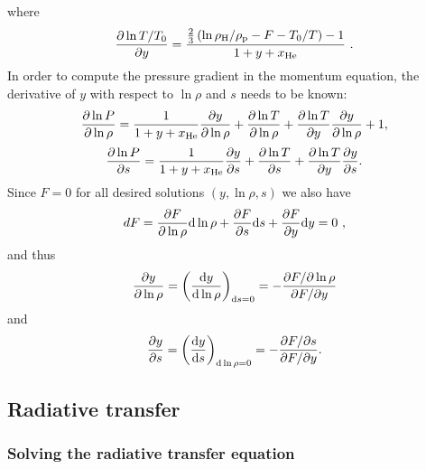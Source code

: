 \documentclass[\mydriver,12pt,twoside,notitlepage,a4paper]{article}
\begin{document}
where
\begin{equation}
\frac{\partial\ln T/T_0}{\partial y}
=\frac{\frac{2}{3}\left(\ln\rho_{\rm H}/\rho_{\rm p}-F-T_0/T\right)-1}
      {1+y+x_{\rm He}}\ .
\end{equation}
In order to compute the pressure gradient in the momentum equation,
the derivative of $y$ with respect
to $\ln\rho$ and $s$ needs to be known:
\begin{equation}
\frac{\partial\ln P}{\partial\ln\rho}
=\frac{1}{1+y+x_{\rm He}}\frac{\partial y}{\partial\ln\rho}
+\frac{\partial\ln T}{\partial\ln\rho}
+\frac{\partial\ln T}{\partial y}\frac{\partial y}{\partial\ln\rho}+1,
\end{equation}
\begin{equation}
\frac{\partial\ln P}{\partial s}
=\frac{1}{1+y+x_{\rm He}}\frac{\partial y}{\partial s}
+\frac{\partial\ln T}{\partial s}
+\frac{\partial\ln T}{\partial y}\frac{\partial y}{\partial s}.
\end{equation}
Since $F=0$ for all desired solutions $(y,\ln\rho,s)$ we also have
\begin{equation}
dF=\frac{\partial F}{\partial\ln\rho}{\rm d}\ln\rho
   +\frac{\partial F}{\partial s}{\rm d} s
   +\frac{\partial F}{\partial y}{\rm d} y=0\ ,
\end{equation}
and thus
\begin{equation}
\frac{\partial y}{\partial\ln\rho}
=\left(\frac{{\rm d} y}{{\rm d}\ln\rho}\right)_{{\rm d} s=0}
=-\frac{\partial F/\partial\ln\rho}{\partial F/\partial y}
\end{equation}
and
\begin{equation}
\frac{\partial y}{\partial s}
=\left(\frac{{\rm d} y}{{\rm d} s}\right)_{{\rm d}\ln\rho=0}
=-\frac{\partial F/\partial s}{\partial F/\partial y}.
\end{equation}


\subsection{Radiative transfer}
\label{S-radi-trans}

\subsubsection{Solving the radiative transfer equation}
\end{document}
